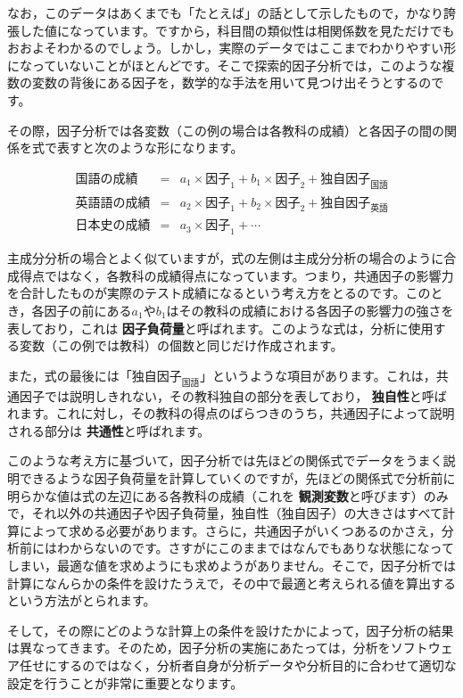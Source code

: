 \documentclass[
  12pt,
  a5jpaper,
  lualatex, ja=standard]{bxjsbook}
\renewcommand{\emph}[1]{\textbf{\color{emph} #1}}
\begin{document}
なお，このデータはあくまでも「たとえば」の話として示したもので，かなり誇張した値になっています。ですから，科目間の類似性は相関係数を見ただけでもおおよそわかるのでしょう。しかし，実際のデータではここまでわかりやすい形になっていないことがほとんどです。そこで探索的因子分析では，このような複数の変数の背後にある因子を，数学的な手法を用いて見つけ出そうとするのです。

その際，因子分析では各変数（この例の場合は各教科の成績）と各因子の間の関係を式で表すと次のような形になります。

\begin{eqnarray*}
\text{国語の成績} &=& a_1 \times \text{因子}_1 + b_1 \times \text{因子}_2 +\text{独自因子}_\text{国語}\\
\text{英語語の成績} &=& a_2 \times \text{因子}_1 + b_2 \times \text{因子}_2 +\text{独自因子}_\text{英語}\\
\text{日本史の成績} &=& a_3 \times \text{因子}_1 +\cdots
\end{eqnarray*}

主成分分析の場合とよく似ていますが，式の左側は主成分分析の場合のように合成得点ではなく，各教科の成績得点になっています。つまり，共通因子の影響力を合計したものが実際のテスト成績になるという考え方をとるのです。このとき，各因子の前にある\(a_1\)や\(b_1\)はその教科の成績における各因子の影響力の強さを表しており，これは\emph{因子負荷量}と呼ばれます。このような式は，分析に使用する変数（この例では教科）の個数と同じだけ作成されます。

また，式の最後には「\(\text{独自因子}_\text{国語}\)」というような項目があります。これは，共通因子では説明しきれない，その教科独自の部分を表しており，\emph{独自性}と呼ばれます。これに対し，その教科の得点のばらつきのうち，共通因子によって説明される部分は\emph{共通性}と呼ばれます。

このような考え方に基づいて，因子分析では先ほどの関係式でデータをうまく説明できるような因子負荷量を計算していくのですが，先ほどの関係式で分析前に明らかな値は式の左辺にある各教科の成績（これを\emph{観測変数}と呼びます）のみで，それ以外の共通因子や因子負荷量，独自性（独自因子）の大きさはすべて計算によって求める必要があります。さらに，共通因子がいくつあるのかさえ，分析前にはわからないのです。さすがにこのままではなんでもありな状態になってしまい，最適な値を求めようにも求めようがありません。そこで，因子分析では計算になんらかの条件を設けたうえで，その中で最適と考えられる値を算出するという方法がとられます。

そして，その際にどのような計算上の条件を設けたかによって，因子分析の結果は異なってきます。そのため，因子分析の実施にあたっては，分析をソフトウェア任せにするのではなく，分析者自身が分析データや分析目的に合わせて適切な設定を行うことが非常に重要となります。
\end{document}
